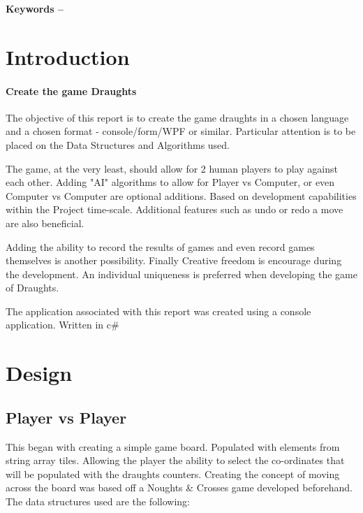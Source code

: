 \documentclass[10pt, a4paper]{article}
\title{\mytitle}
\author{\myauthor\hspace{1em}\\\contact\\Edinburgh Napier University\hspace{0.5em}-\hspace{0.5em}\mymodule}
\date{}
\begin{document}
    \maketitle
    \begin{abstract} 
        hello.
    \end{abstract}
    
    \textbf{Keywords -- }{\mykeywords}
    
    \section{Introduction}
    \paragraph{Create the game Draughts}
    The objective of this report is to create the game draughts in a chosen language and a chosen format - console/form/WPF or similar. Particular attention is to be placed on the Data Structures and Algorithms used.
    
    The game, at the very least, should allow for 2 human players to play against each other. Adding "AI" algorithms to allow for Player vs Computer, or even Computer vs Computer are optional additions. Based on development capabilities within the Project time-scale. Additional features such as undo or redo a move are also beneficial.
    
    Adding the ability to record the results of games and even record games themselves is another possibility. Finally Creative freedom is encourage during the development. An individual uniqueness is preferred when developing the game of Draughts.
    
    The application associated with this report was created using a console application. Written in c\#
    \section{Design}
    \subsection{{Player vs Player}}
    This began with creating a simple game board. Populated with elements from string array tiles. Allowing the player the ability to select the co-ordinates that will be populated with the draughts counters. Creating the concept of moving across the board was based off a Noughts \& Crosses game developed beforehand. 
    The data structures used are the following:
    
\end{document}
